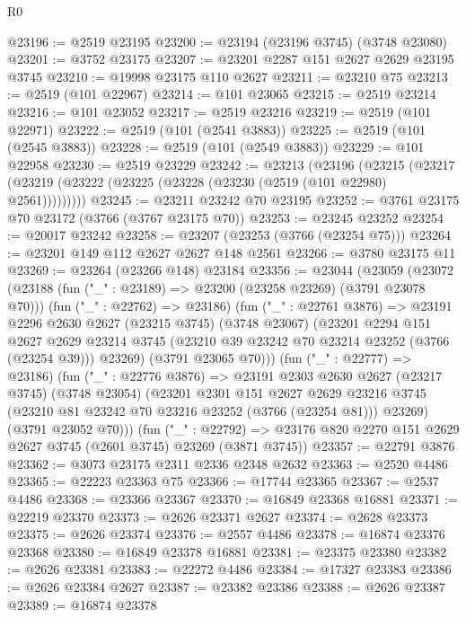 \begin{lexlean}{R0}
\begin{coremodule}
@23196 := @2519 @23195
@23200 := @23194 (@23196 @3745) (@3748 @23080)
@23201 := @3752 @23175
@23207 := @23201 @2287 @151 @2627 @2629 @23195 @3745
@23210 := @19998 @23175 @110 @2627
@23211 := @23210 @75
@23213 := @2519 (@101 @22967)
@23214 := @101 @23065
@23215 := @2519 @23214
@23216 := @101 @23052
@23217 := @2519 @23216
@23219 := @2519 (@101 @22971)
@23222 := @2519 (@101 (@2541 @3883))
@23225 := @2519 (@101 (@2545 @3883))
@23228 := @2519 (@101 (@2549 @3883))
@23229 := @101 @22958
@23230 := @2519 @23229
@23242 := @23213
    (@23196
      (@23215 (@23217 (@23219 (@23222 (@23225 (@23228 (@23230 (@2519 (@101 @22980) @2561)))))))))
@23245 := @23211 @23242 @70 @23195
@23252 := @3761 @23175 @70 @23172 (@3766 (@3767 @23175 @70))
@23253 := @23245 @23252
@23254 := @20017 @23242
@23258 := @23207 (@23253 (@3766 (@23254 @75)))
@23264 := @23201 @149 @112 @2627 @2627 @148 @2561
@23266 := @3780 @23175 @11
@23269 := @23264 (@23266 @148) @23184
@23356 := @23044
    (@23059
      (@23072
        (@23188 (fun ("_" : @23189) => @23200 (@23258 @23269) (@3791 @23078 @70)))
        (fun ("_" : @22762) => @23186)
        (fun ("_" : @22761 @3876) =>
        @23191
          @2296
          @2630
          @2627
          (@23215 @3745)
          (@3748 @23067)
          (@23201
            @2294
            @151
            @2627
            @2629
            @23214
            @3745
            (@23210 @39 @23242 @70 @23214 @23252 (@3766 (@23254 @39)))
            @23269)
          (@3791 @23065 @70)))
      (fun ("_" : @22777) => @23186)
      (fun ("_" : @22776 @3876) =>
      @23191
        @2303
        @2630
        @2627
        (@23217 @3745)
        (@3748 @23054)
        (@23201
          @2301
          @151
          @2627
          @2629
          @23216
          @3745
          (@23210 @81 @23242 @70 @23216 @23252 (@3766 (@23254 @81)))
          @23269)
        (@3791 @23052 @70)))
    (fun ("_" : @22792) =>
    @23176 @820 @2270 @151 @2629 @2627 @3745 (@2601 @3745) @23269 (@3871 @3745))
@23357 := @22791 @3876
@23362 := @3073 @23175 @2311 @2336 @2348 @2632
@23363 := @2520 @4486
@23365 := @22223 @23363 @75
@23366 := @17744 @23365
@23367 := @2537 @4486
@23368 := @23366 @23367
@23370 := @16849 @23368 @16881
@23371 := @22219 @23370
@23373 := @2626 @23371 @2627
@23374 := @2628 @23373
@23375 := @2626 @23374
@23376 := @2557 @4486
@23378 := @16874 @23376 @23368
@23380 := @16849 @23378 @16881
@23381 := @23375 @23380
@23382 := @2626 @23381
@23383 := @22272 @4486
@23384 := @17327 @23383
@23386 := @2626 @23384 @2627
@23387 := @23382 @23386
@23388 := @2626 @23387
@23389 := @16874 @23378

\end{coremodule}
\end{lexlean}
